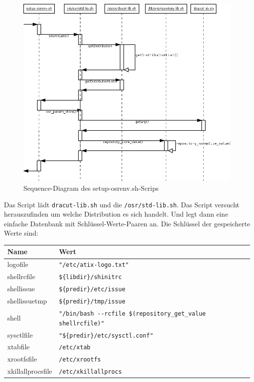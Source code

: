 \documentclass[10pt,a4paper]{article}
\begin{document}
\begin{figure}[H]
 \centering
 \includegraphics[width=1.0\textwidth,height=1.0\textwidth]{./sequence_diagram_setup-osrenv_DE_de.png}
 \caption[]{Sequence-Diagram des setup-osrenv.sh-Scrips}
\end{figure}

Das Script lädt \texttt{dracut-lib.sh} und die \texttt{/osr/std-lib.sh}. Das Script versucht herauszufinden um welche Distribution es sich handelt. Und legt dann eine einfache Datenbank  mit Schlüssel-Werte-Paaren an. Die Schlüssel der gespeicherte Werte sind:
\medskip 

\begin{tabular}{|l|l|}
 \hline
\textbf{Name} & \textbf{ Wert} \\ \hline
logofile          & \verb|"/etc/atix-logo.txt"|  \\ \hline
shellrcfile       & \verb|${libdir}/shinitrc|  \\ \hline
shellissue        & \verb|${predir}/etc/issue|  \\ \hline
shellissuetmp     & \verb|${predir}/tmp/issue|  \\ \hline
shell             & \verb|"/bin/bash --rcfile $(repository_get_value shellrcfile)"|  \\ \hline
sysctlfile        & \verb|"${predir}/etc/sysctl.conf"|  \\ \hline
xtabfile          & \verb|/etc/xtab|  \\ \hline
xrootfsfile       & \verb|/etc/xrootfs|  \\ \hline
xkillallprocsfile & \verb|/etc/xkillallprocs|  \\ \hline
\end{tabular} 
\end{document}
